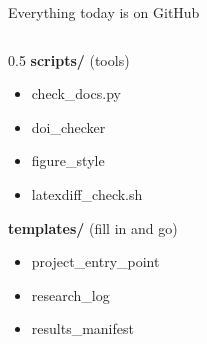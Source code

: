 \begin{frame}[fragile]{Everything today is on GitHub}
\begin{columns}[t]
\begin{column}{0.5\textwidth}
      {\small\textbf{scripts/} \scriptsize(tools)}
      \begin{itemize}\scriptsize\setlength\itemsep{0.15em}
        \item check\_docs.py
        \item doi\_checker
        \item figure\_style
        \item latexdiff\_check.sh
      \end{itemize}
      \vspace{0.5em}
      {\small\textbf{templates/} \scriptsize(fill in and go)}
      \begin{itemize}\scriptsize\setlength\itemsep{0.15em}
        \item project\_entry\_point
        \item research\_log
        \item results\_manifest
      \end{itemize}
    \end{column}
  \end{columns}
  \vspace{0.75cm}
  \vfill
\end{frame}
